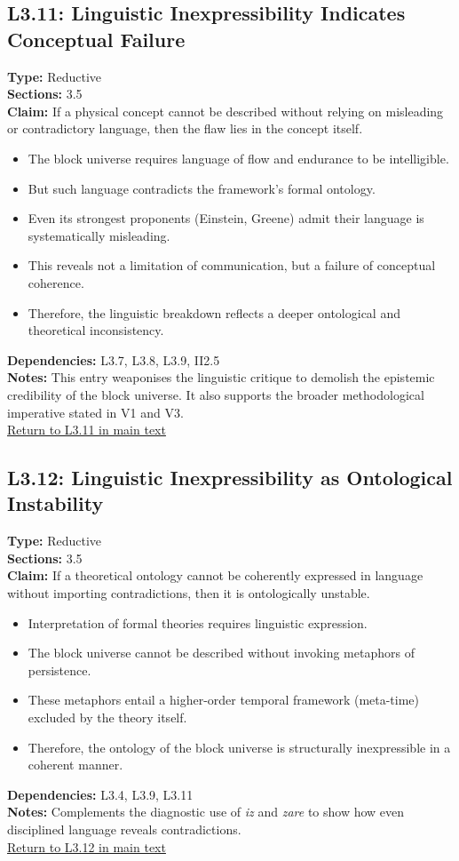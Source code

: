 \documentclass[12pt]{book}
\newcommand{\returnlink}[1]{\hyperref[logic:#1]{Return to #1 in main text}\xspace}
\begin{document}
\subsection*{L3.11: Linguistic Inexpressibility Indicates Conceptual Failure}\label{appendix:L3.11}
\textbf{Type:} Reductive \\
\textbf{Sections:} 3.5 \\
\textbf{Claim:} If a physical concept cannot be described without relying on misleading or contradictory language, then the flaw lies in the concept itself.
\begin{itemize}
  \item The block universe requires language of flow and endurance to be intelligible.
  \item But such language contradicts the framework's formal ontology.
  \item Even its strongest proponents (Einstein, Greene) admit their language is systematically misleading.
  \item This reveals not a limitation of communication, but a failure of conceptual coherence.
  \item Therefore, the linguistic breakdown reflects a deeper ontological and theoretical inconsistency.
\end{itemize}
\textbf{Dependencies:} L3.7, L3.8, L3.9, II2.5 \\
\textbf{Notes:} This entry weaponises the linguistic critique to demolish the epistemic credibility of the block universe. It also supports the broader methodological imperative stated in V1 and V3.\\
\returnlink{L3.11}

\subsection*{L3.12: Linguistic Inexpressibility as Ontological Instability}
\label{appendix:L3.12}
\textbf{Type:} Reductive \\
\textbf{Sections:} 3.5 \\
\textbf{Claim:} If a theoretical ontology cannot be coherently expressed in language without importing contradictions, then it is ontologically unstable. \\
\begin{itemize}
  \item Interpretation of formal theories requires linguistic expression.
  \item The block universe cannot be described without invoking metaphors of persistence.
  \item These metaphors entail a higher-order temporal framework (meta-time) excluded by the theory itself.
  \item Therefore, the ontology of the block universe is structurally inexpressible in a coherent manner.
\end{itemize}
\textbf{Dependencies:} L3.4, L3.9, L3.11 \\
\textbf{Notes:} Complements the diagnostic use of \textit{iz} and \textit{zare} to show how even disciplined language reveals contradictions. \\
\returnlink{L3.12}
\end{document}
